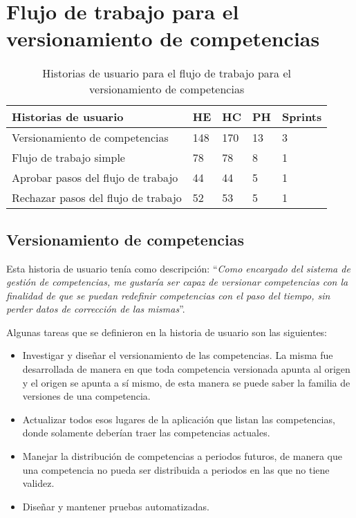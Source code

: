 \section{Flujo de trabajo para el versionamiento de competencias}

\begin{table}[H]
\centering
\caption{Historias de usuario para el flujo de trabajo para el versionamiento de competencias}
\label{epic:3}
\begin{tabular}{@{}lllll@{}}
\toprule
Historias de usuario                & HE  & HC  & PH & Sprints \\ \midrule
Versionamiento de competencias      & 148 & 170 & 13 & 3       \\
Flujo de trabajo simple             & 78  & 78  & 8  & 1       \\
Aprobar pasos del flujo de trabajo  & 44  & 44  & 5  & 1       \\
Rechazar pasos del flujo de trabajo & 52  & 53  & 5  & 1       \\ \bottomrule
\end{tabular}
\end{table}

\subsection{Versionamiento de competencias}
Esta historia de usuario tenía como descripción: \enquote{\textit{Como encargado del sistema de gestión de competencias, me gustaría ser capaz de versionar competencias con la finalidad de que se puedan redefinir competencias con el paso del tiempo, sin perder datos de corrección de las mismas}}.

Algunas tareas que se definieron en la historia de usuario son las siguientes:
\begin{itemize}
	\item Investigar y diseñar el versionamiento de las competencias. La misma fue desarrollada de manera en que toda competencia versionada apunta al origen y el origen se apunta a sí mismo, de esta manera se puede saber la familia de versiones de una competencia.
	\item Actualizar todos esos lugares de la aplicación que listan las competencias, donde solamente deberían traer las competencias actuales.
	\item Manejar la distribución de competencias a periodos futuros, de manera que una competencia no pueda ser distribuida a periodos en las que no tiene validez.
	\item Diseñar y mantener pruebas automatizadas.
\end{itemize}

